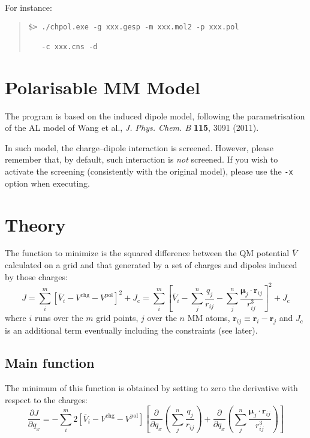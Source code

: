 \documentclass[a4paper]{report}
\newcommand{\bs}{\boldsymbol}
\newcommand{\mr}{\mathrm}
\begin{document}
For instance:
\begin{framed}
\begin{quote}
\begin{verbatim}
$> ./chpol.exe -g xxx.gesp -m xxx.mol2 -p xxx.pol 

   -c xxx.cns -d
\end{verbatim}
\end{quote}
\end{framed}

\section*{Polarisable MM Model}

The program is based on the induced dipole model, following the parametrisation of the AL model of Wang et al., \emph{J. Phys. Chem. B} \textbf{115}, 3091 (2011).

In such model, the charge--dipole interaction is screened. However, please remember that, by default, such interaction is \emph{not} screened. If you wish to activate the screening (consistently with the original model), please use the \texttt{-x} option when executing.

\section*{Theory}

The function to minimize is the squared difference between the QM potential
$\overline{V}$ calculated on a grid and that generated by a set of charges and
dipoles induced by those charges:
\begin{equation}
J = \sum_i^m \left[ \overline{V}_i - V^\mr{chg} - V^\mr{pol} \right]^2 + J_\mr{c} = \sum_i^m
\left[ \overline{V}_i - \sum_j^n \frac{q_j}{r_{ij}} - \sum_j^n \frac{\bs{\mu}_j \cdot
\bs{r}_{ij}}{r_{ij}^3} \right]^2 + J_\mr{c}
\end{equation}
where $i$ runs over the $m$ grid points, $j$ over the $n$ MM atoms,
$\bs{r}_{ij}\equiv\bs{r}_i - \bs{r}_j$ and $J_\mr{c}$ is an additional term
eventually including the constraints (see later).

\subsection*{Main function}

The minimum of this function is obtained by setting to zero the derivative with
respect to the charges:
\begin{equation}
\label{deriv}
\frac{\partial J}{\partial q_x} = - \sum_i^m 2 \left[ \overline{V}_i - V^\mr{chg} -
V^\mr{pol} \right] \left[ \frac{\partial}{\partial q_x} \left(\sum_j^n
\frac{q_j}{r_{ij}}\right) + \frac{\partial}{\partial q_x} \left(\sum_j^n
\frac{\bs{\mu}_j \cdot \bs{r}_{ij}}{r_{ij}^3} \right)\right]
\end{equation}
\end{document}
